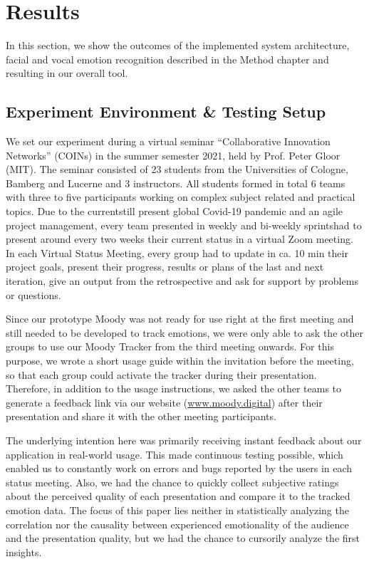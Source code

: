 \section{Results}
\label{sec:results}
In this section, we show the outcomes of the implemented system architecture, facial and vocal emotion recognition described in the Method chapter and resulting in our overall tool.

\subsection{Experiment Environment \& Testing Setup}
\label{subsec:results_experiment_environment_and_testing_setup}
We set our experiment during a virtual seminar “Collaborative Innovation Networks” (COINs) in the summer semester 2021, held by Prof. Peter Gloor (MIT). The seminar consisted of 23 students from the Universities of Cologne, Bamberg and Lucerne and 3 instructors. All students formed in total 6 teams with three to five participants working on complex subject related and practical topics. Due to the currentstill present global Covid-19 pandemic and an agile project management, every team presented in weekly and bi-weekly sprintshad to present around every two weeks their current status in a virtual Zoom meeting. In each Virtual Status Meeting, every group had to update in ca. 10 min their project goals, present their progress, results or plans  of the last and next iteration, give an output from the retrospective and ask for support by problems or questions.

Since our prototype Moody was not ready for use right at the first meeting and still needed to be developed to track emotions, we were only able to ask the other groups to use our Moody Tracker from the third meeting onwards. For this purpose, we wrote a short usage guide within the invitation before the meeting, so that each group could activate the tracker during their presentation. Therefore, in addition to the usage instructions, we asked the other teams to generate a feedback link via our website (\url{www.moody.digital}) after their presentation and share it with the other meeting participants.

The underlying intention here was primarily receiving instant feedback about our application in real-world usage. This made continuous testing possible, which enabled us to constantly work on errors and bugs reported by the users in each status meeting. Also, we had the chance to quickly collect subjective ratings about the perceived quality of each presentation and compare it to the tracked emotion data. The focus of this paper lies neither in statistically analyzing the correlation nor the causality between experienced emotionality of the audience and the presentation quality, but we had the chance to cursorily analyze the first insights.

